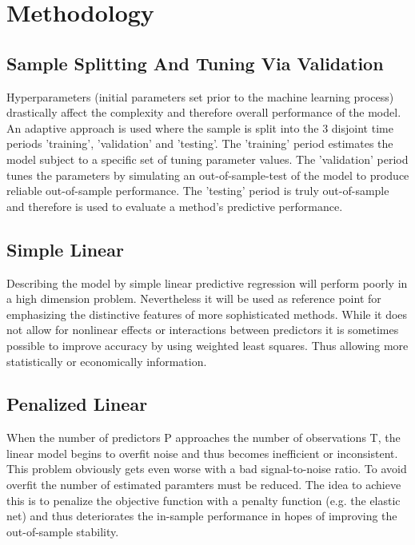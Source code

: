 \section{Methodology}

\subsection{Sample Splitting And Tuning Via Validation}
	Hyperparameters (initial parameters set prior to the machine learning process)
	drastically affect the complexity and therefore overall performance of the model.
	An adaptive approach is used where the sample is split into the 3 disjoint time periods
	'training', 'validation' and 'testing'. The 'training' period estimates the model
	subject to a specific set of tuning parameter values. The 'validation' period
	tunes the parameters by simulating an out-of-sample-test of the model
	to produce reliable out-of-sample performance. The 'testing' period is truly
	out-of-sample and therefore is used to evaluate a method’s predictive performance.

\subsection{Simple Linear}
	Describing the model by simple linear predictive regression will perform poorly in a high
	dimension problem. Nevertheless it will be used as reference point for emphasizing
	the distinctive features of more sophisticated methods.
	While it does not allow for nonlinear effects or interactions between predictors
	it is sometimes possible to improve accuracy by using weighted least squares.
	Thus allowing more statistically or economically information.

\subsection{Penalized Linear}
	When the number of predictors P approaches the number of observations T,
	the linear model begins to overfit noise and thus becomes inefficient or inconsistent.
	This problem obviously gets even worse with a bad signal-to-noise ratio.
	To avoid overfit the number of estimated paramters must be reduced.
	The idea to achieve this is to penalize the objective function with a penalty
	function (e.g. the elastic net) and thus deteriorates the in-sample performance
	in hopes of improving the out-of-sample stability.

